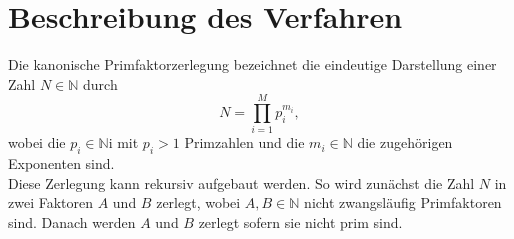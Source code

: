 \section{Beschreibung des Verfahren}
Die kanonische Primfaktorzerlegung bezeichnet die eindeutige Darstellung einer Zahl $N\in\mathbb{N}$ durch
\begin{equation*}
  N=\prod\limits_{i=1}^M p_i^{m_i},
\end{equation*}
wobei die $p_i\in\mathbb{N}$i mit $p_i>1$ Primzahlen und die $m_i\in\mathbb{N}$ die zugehörigen Exponenten sind.\\
Diese Zerlegung kann rekursiv aufgebaut werden. So wird zunächst die Zahl $N$ in zwei Faktoren $A$ und $B$ zerlegt, wobei $A,B\in\mathbb{N}$ nicht zwangsläufig Primfaktoren sind. Danach werden $A$ und $B$ zerlegt sofern sie nicht prim sind.\\

